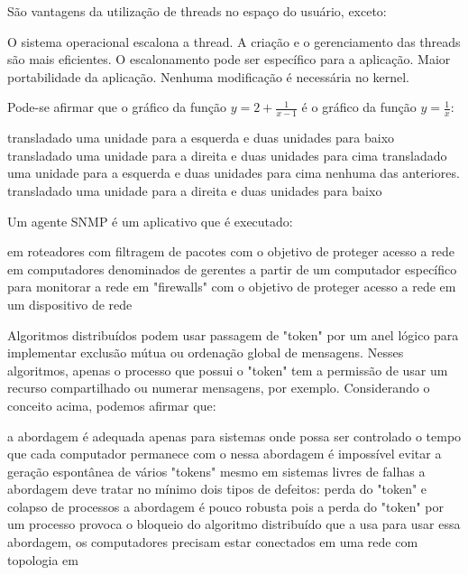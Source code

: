 \documentclass[12pt, addpoints]{exam}
\begin{document}
\begin{questions}
\question
São vantagens da utilização de threads no espaço do usuário, exceto:
\begin{choices}
\choice O sistema operacional escalona a thread.
\choice A criação e o gerenciamento das threads são mais eficientes.
\choice O escalonamento pode ser específico para a aplicação.
\choice Maior portabilidade da aplicação.
\choice Nenhuma modificação é necessária no kernel.
\end{choices}

\question
Pode-se afirmar que o gráfico da função \(y = 2 + \frac{1}{x - 1}\) é o gráfico da função \(y = \frac{1}{x}\):
\begin{choices}
\choice transladado uma unidade para a esquerda e duas unidades para baixo
\choice transladado uma unidade para a direita e duas unidades para cima
\choice transladado uma unidade para a esquerda e duas unidades para cima
\choice nenhuma das anteriores.
\choice transladado uma unidade para a direita e duas unidades para baixo
\end{choices}

\question
Um agente SNMP é um aplicativo que é executado:
\begin{choices}
\choice em roteadores com filtragem de pacotes com o objetivo de proteger acesso a rede
\choice em computadores denominados de gerentes
\choice a partir de um computador específico para monitorar a rede
\choice em "firewalls" com o objetivo de proteger acesso a rede
\choice em um dispositivo de rede
\end{choices}

\question
Algoritmos distribuídos podem usar passagem de "token" por um anel lógico para implementar exclusão mútua ou ordenação global de mensagens. Nesses algoritmos, apenas o processo que possui o "token" tem a permissão de usar um recurso compartilhado ou numerar mensagens, por exemplo. Considerando o conceito acima, podemos afirmar que: 
\begin{choices}
\choice a abordagem é adequada apenas para sistemas onde possa ser controlado o tempo que cada computador permanece com o 
\choice nessa abordagem é impossível evitar a geração espontânea de vários "tokens" mesmo em sistemas livres de falhas 
\choice a abordagem deve tratar no mínimo dois tipos de defeitos: perda do "token" e colapso de processos 
\choice a abordagem é pouco robusta pois a perda do "token" por um processo provoca o bloqueio do algoritmo distribuído que a usa 
\choice para usar essa abordagem, os computadores precisam estar conectados em uma rede com topologia em 
\end{choices}


\end{questions}
\end{document}
